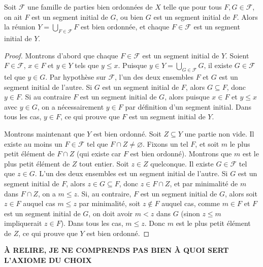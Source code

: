 \begin{lemme}\label{ens : bo : segment_initial}
	Soit $\mathcal{F}$ une famille de parties bien ordonnées de $X$ telle que pour tous $F, G \in \mathcal{F}$, on ait  $F$ est un segment initial de $G$, ou bien $G$ est un segment initial de $F$. Alors la réunion $Y = \bigcup_{F \in \mathcal{F}} F$ est bien ordonnée, et chaque $F \in \mathcal{F}$ est un segment initial de $Y$.
\end{lemme}
\begin{proof}
	Montrons d'abord que chaque $F \in \mathcal{F}$ est un segment initial de $Y$. Soient $F \in \mathcal{F}$, $x \in F$ et $y \in Y$ tels que $y \leqslant x$. Puisque $y \in Y = \bigcup_{G \in \mathcal{F}} G$, il existe $G \in \mathcal{F}$ tel que $y \in G$. Par hypothèse sur $\mathcal{F}$, l'un des deux ensembles $F$ et $G$ est un segment initial de l'autre. Si $G$ est un segment initial de $F$, alors $G \subseteq F$, donc $y \in F$. Si au contraire $F$ est un segment initial de $G$, alors puisque $x \in F$ et $y \leqslant x$ avec $y \in G$, on a nécessairement $y \in F$ par définition d'un segment initial. Dans tous les cas, $y \in F$, ce qui prouve que $F$ est un segment initial de $Y$.

	Montrons maintenant que $Y$ est bien ordonné. Soit $Z \subseteq Y$ une partie non vide. Il existe au moins un $F \in \mathcal{F}$ tel que $F \cap Z \neq \varnothing$. Fixons un tel $F$, et soit $m$ le plus petit élément de $F \cap Z$ (qui existe car $F$ est bien ordonné). Montrons que $m$ est le plus petit élément de $Z$ tout entier. Soit $z \in Z$ quelconque. Il existe $G \in \mathcal{F}$ tel que $z \in G$. L'un des deux ensembles est un segment initial de l'autre. Si $G$ est un segment initial de $F$, alors $z \in G \subseteq F$, donc $z \in F \cap Z$, et par minimalité de $m$ dans $F \cap Z$, on a $m \leqslant z$. Si, au contraire, $F$ est un segment initial de $G$, alors soit $z \in F$ auquel cas $m \leqslant z$ par minimalité, soit $z \notin F$ auquel cas, comme $m \in F$ et $F$ est un segment initial de $G$, on doit avoir $m < z$ dans $G$ (sinon $z \leqslant m$ impliquerait $z \in F$). Dans tous les cas, $m \leqslant z$. Donc $m$ est le plus petit élément de $Z$, ce qui prouve que $Y$ est bien ordonné.
\end{proof}
\textbf{À RELIRE, JE NE COMPRENDS PAS BIEN À QUOI SERT L'AXIOME DU CHOIX}
